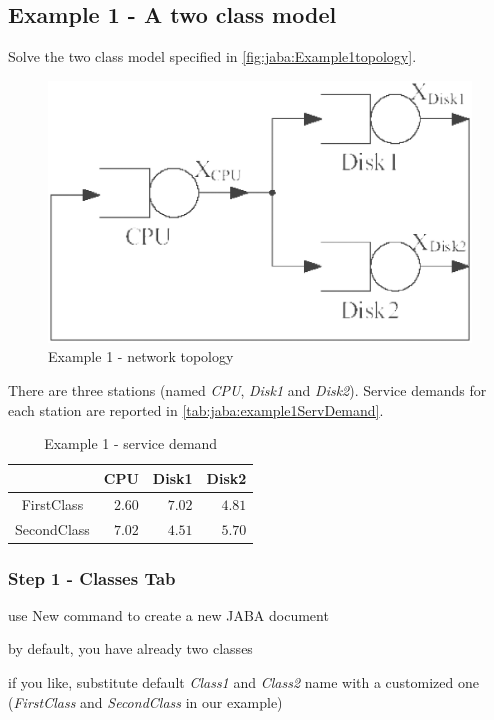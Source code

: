 \subsection{Example 1 - A two class model}
\label{sec:jaba:example1} Solve the two class model specified in
\autoref{fig:jaba:Example1topology}.
\begin{figure}[htbp]
    \begin{center}
        \includegraphics[scale=.35]{img/jaba/example1}
    \end{center}
    \caption{Example 1 - network topology}
    \label{fig:jaba:Example1topology}
\end{figure}

There are three stations (named
\emph{CPU}, \emph{Disk1} and \emph{Disk2}).
Service demands for each station are reported in
\autoref{tab:jaba:example1ServDemand}.

\begin{table}[htbp]
\begin{center}
\begin{tabular}{c|r|r|r|}
& \multicolumn{1}{c|}{CPU} & \multicolumn{1}{c|}{Disk1} & \multicolumn{1}{c|}{Disk2} \\
\hline
FirstClass & $2.60$ & $7.02$ & $4.81$ \\
SecondClass & $7.02$ & $4.51$ & $5.70$ \\
\hline
\end{tabular}
\end{center}
\caption{Example 1 - service demand}
\label{tab:jaba:example1ServDemand}
\end{table}

\subsubsection{Step 1 - Classes Tab}
\begin{itemize*}
\item use New command to create a new JABA document
\item by default, you have already two classes
\item if you like, substitute default \emph{Class1} and \emph{Class2} name with a customized
one (\emph{FirstClass} and \emph{SecondClass} in our example)
\end{itemize*}

